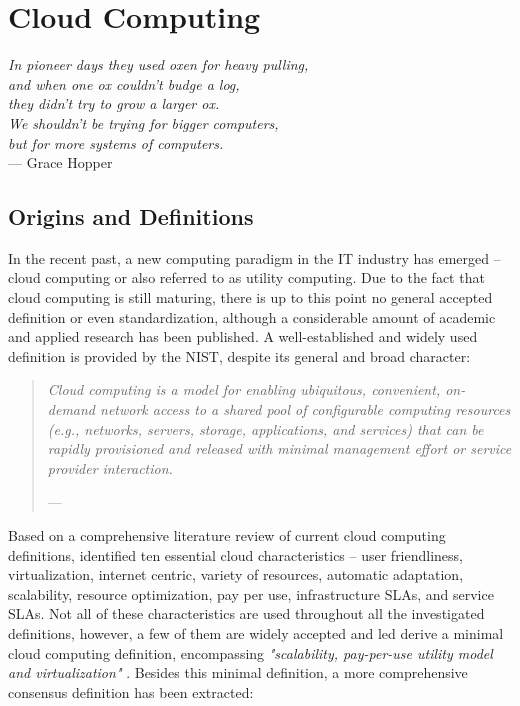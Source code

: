 \section{Cloud Computing}\label{ch:tf:paas}
\begin{flushright}{\slshape 
	In pioneer days they used oxen for heavy pulling,\\
	and when one ox couldn't budge a log,\\
	they didn't try to grow a larger ox.\\
	We shouldn't be trying for bigger computers,\\
	but for more systems of computers.} \\ \medskip
	--- Grace Hopper
\end{flushright}

\vspace*{-18pt}

\subsection{Origins and Definitions}

In the recent past, a new computing paradigm in the \ac{IT} industry has emerged -- cloud computing or also referred to as utility computing. Due to the fact that cloud computing is still maturing, there is up to this point no general accepted definition or even standardization, although a considerable amount of academic and applied research has been published. A well-established and widely used definition is provided by the \ac{NIST}, despite its general and broad character:

\begin{quotation}{\slshape 
Cloud computing is a model for enabling ubiquitous, convenient, on-demand network access to a shared pool of configurable computing resources (e.g., networks, servers, storage, applications, and services) that can be rapidly provisioned and released with minimal management effort or service provider interaction.}
\vspace*{-7pt}
\begin{flushright}
	--- \citealp[p. 2]{Mell2011}
\end{flushright}
\end{quotation}

Based on a comprehensive literature review of current cloud computing definitions, \citet{Vaquero2009} identified ten essential cloud characteristics -- user friendliness, virtualization, internet centric, variety of resources, automatic adaptation, scalability, resource optimization, pay per use, infrastructure \acp{SLA}, and service \acp{SLA}. Not all of these characteristics are used throughout all the investigated definitions, however, a few of them are widely accepted and led \citet{Vaquero2009} derive a minimal cloud computing definition, encompassing \textit{"scalability, pay-per-use utility model and virtualization"} \citep[p. 51]{Vaquero2009}. Besides this minimal definition, a more comprehensive consensus definition has been extracted:

